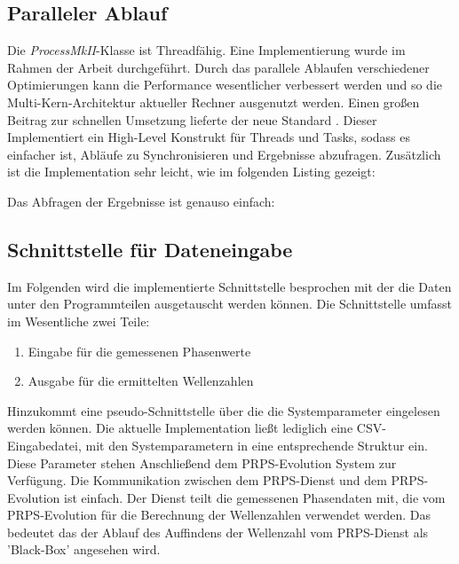 \subsection{Paralleler Ablauf}
\label{parallel_computing}
%
Die \textit{ProcessMkII}-Klasse ist Threadfähig. Eine Implementierung wurde im Rahmen der Arbeit durchgeführt. Durch das parallele Ablaufen verschiedener Optimierungen kann die Performance wesentlicher verbessert werden und so die Multi-Kern-Architektur aktueller Rechner ausgenutzt werden. Einen großen Beitrag zur schnellen Umsetzung lieferte der neue Standard . Dieser Implementiert ein High-Level Konstrukt für Threads und Tasks, sodass es einfacher ist, Abläufe zu Synchronisieren und Ergebnisse abzufragen. Zusätzlich ist die Implementation sehr leicht, wie im folgenden Listing gezeigt:
%

				 \label{lst:Parallel_example1.cpp}
%
\vspace{2mm}
Das Abfragen der Ergebnisse ist genauso einfach:
\vspace{2mm}
%

				 \label{lst:Parallel_example2.cpp}
%
\vspace{2mm}
%
\subsection{Schnittstelle für Dateneingabe}
%
Im Folgenden wird die implementierte Schnittstelle besprochen mit der die Daten unter den Programmteilen ausgetauscht werden können. Die Schnittstelle umfasst im Wesentliche zwei Teile:
\begin{enumerate}
	\item Eingabe für die gemessenen Phasenwerte
	\item Ausgabe für die ermittelten Wellenzahlen
\end{enumerate}
%
Hinzukommt eine pseudo-Schnittstelle über die die Systemparameter eingelesen werden können. Die aktuelle Implementation ließt lediglich eine CSV-Eingabedatei, mit den Systemparametern in eine entsprechende Struktur ein. Diese Parameter stehen Anschließend dem PRPS-Evolution System zur Verfügung.
%
Die Kommunikation zwischen dem PRPS-Dienst und dem PRPS-Evolution ist einfach. Der Dienst teilt die gemessenen Phasendaten mit, die vom PRPS-Evolution für die Berechnung der Wellenzahlen verwendet werden. Das bedeutet das der Ablauf des Auffindens der Wellenzahl vom PRPS-Dienst als 'Black-Box' angesehen wird.\\
%
%
